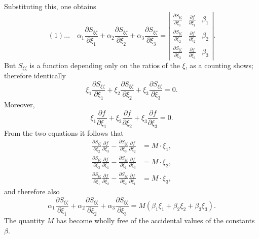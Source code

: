 \documentclass[10pt]{article}
\begin{document}
Substituting this, one obtains
\[
(1)\ldots\quad
\alpha_1\frac{\partial S_{\xi\zeta}}{\partial \xi_1}+\alpha_2\frac{\partial S_{\xi\zeta}}{\partial \xi_2}+\alpha_3\frac{\partial S_{\xi\zeta}}{\partial \xi_3}
=\left|
\begin{array}{ccc}
\frac{\partial S_{\xi\zeta}}{\partial \xi_1}&\frac{\partial f}{\partial \xi_1}&\beta_1\\
\frac{\partial S_{\xi\zeta}}{\partial \xi_2}&\frac{\partial f}{\partial \xi_2}&\beta_2\\
\frac{\partial S_{\xi\zeta}}{\partial \xi_3}&\frac{\partial f}{\partial \xi_3}&\beta_3
\end{array}
\right|.
\]
But $S_{\xi\zeta}$ is a function depending only on the ratios of the $\xi$, as a counting shows; therefore identically
\[
\xi_1\frac{\partial S_{\xi\zeta}}{\partial \xi_1}+\xi_2\frac{\partial S_{\xi\zeta}}{\partial \xi_2}+\xi_3\frac{\partial S_{\xi\zeta}}{\partial \xi_3}=0.
\]
Moreover,
\[
\xi_1\frac{\partial f}{\partial \xi_1}+\xi_2\frac{\partial f}{\partial \xi_2}+\xi_3\frac{\partial f}{\partial \xi_3}=0.
\]
From the two equations it follows that
\[
\begin{aligned}
\frac{\partial S_{\xi\zeta}}{\partial \xi_2}\frac{\partial f}{\partial \xi_3}
-\frac{\partial S_{\xi\zeta}}{\partial \xi_3}\frac{\partial f}{\partial \xi_2}&=M\cdot\xi_1,\\
\frac{\partial S_{\xi\zeta}}{\partial \xi_3}\frac{\partial f}{\partial \xi_1}
-\frac{\partial S_{\xi\zeta}}{\partial \xi_1}\frac{\partial f}{\partial \xi_3}&=M\cdot\xi_2,\\
\frac{\partial S_{\xi\zeta}}{\partial \xi_1}\frac{\partial f}{\partial \xi_2}
-\frac{\partial S_{\xi\zeta}}{\partial \xi_2}\frac{\partial f}{\partial \xi_1}&=M\cdot\xi_3,
\end{aligned}
\]
and therefore also
\[
\alpha_1\frac{\partial S_{\xi\zeta}}{\partial \xi_1}
+\alpha_2\frac{\partial S_{\xi\zeta}}{\partial \xi_2}
+\alpha_3\frac{\partial S_{\xi\zeta}}{\partial \xi_3}
=M(\beta_1\xi_1+\beta_2\xi_2+\beta_3\xi_3).
\]
The quantity $M$ has become wholly free of the accidental values of the constants $\beta$.
\end{document}
